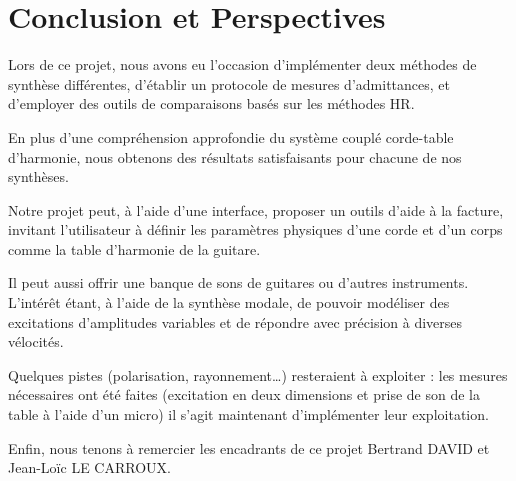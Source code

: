 \chapter*{Conclusion et Perspectives}
Lors de ce projet, nous avons eu l'occasion d'implémenter deux méthodes de synthèse différentes, d'établir un protocole de mesures d'admittances, et d'employer des outils de comparaisons basés sur les méthodes HR.

En plus d'une compréhension approfondie du système couplé corde-table d'harmonie, nous obtenons des résultats satisfaisants pour chacune de nos synthèses.

Notre projet peut, à l'aide d'une interface, proposer un outils d'aide à la facture, invitant l'utilisateur à définir les paramètres physiques d'une corde et d'un corps comme la table d'harmonie de la guitare.

Il peut aussi offrir une banque de sons de guitares ou d'autres instruments. L'intérêt étant, à l'aide de la synthèse modale, de pouvoir modéliser des excitations d'amplitudes variables et de répondre avec précision à diverses vélocités.

Quelques pistes (polarisation, rayonnement\dots) resteraient à exploiter : les mesures nécessaires ont été faites (excitation en deux dimensions et prise de son de la table à l'aide d'un micro) il s'agit maintenant d'implémenter leur exploitation. 

Enfin, nous tenons à remercier les encadrants de ce projet Bertrand DAVID et Jean-Loïc LE CARROUX.